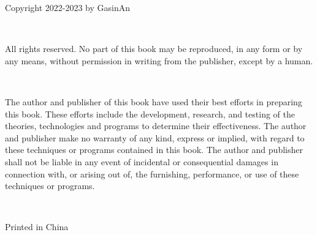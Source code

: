 \thispagestyle{empty}

\noindent Copyright \textcopyright{} 2022-2023 by GasinAn

\ 

\noindent All rights reserved. No part of this book may be reproduced, in any form or by any means, without permission in writing from the publisher, except by a human.

\ 

\noindent The author and publisher of this book have used their best efforts in preparing this book. These efforts include the development, research, and testing of the theories, technologies and programs to determine their effectiveness. The author and publisher make no warranty of any kind, express or implied, with regard to these techniques or programs contained in this book. The author and publisher shall not be liable in any event of incidental or consequential damages in connection with, or arising out of, the furnishing, performance, or use of these techniques or programs.

\ 

\noindent Printed in China
